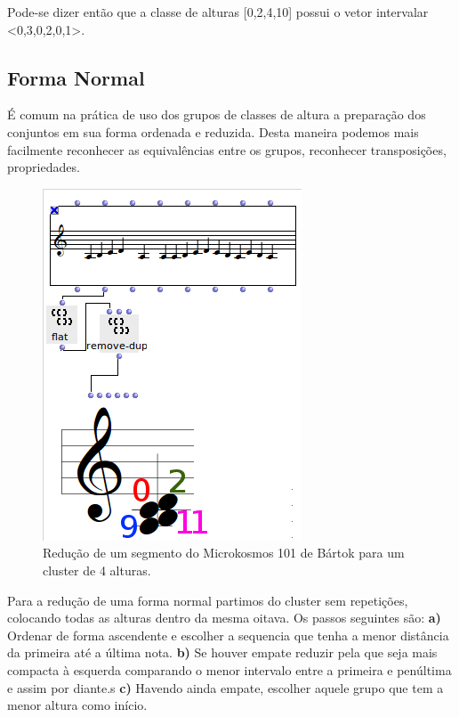 \documentclass[
	12pt,				%
	openright,			%
	twoside,			%
	a4paper,			%
	english,			%
	french,				%
	spanish,			%
	brazil				%
	]{abntex2}
\begin{document}
Pode-se dizer então que a classe de alturas [0,2,4,10] possui o vetor intervalar <0,3,0,2,0,1>.


\subsection{Forma Normal} 

É comum na prática de uso dos grupos de classes de altura a preparação dos conjuntos em sua forma ordenada e reduzida. Desta maneira podemos mais facilmente reconhecer as equivalências entre os grupos, reconhecer transposições, propriedades.


\begin{figure}[h]
	\caption{\label{fig_grafico}Redução de um segmento do Microkosmos 101 de Bártok para um cluster de 4 alturas. }
	\begin{center}
	    \includegraphics[scale=0.7]{OM_settheory/reducao_acorde.png}
	\end{center}
\end{figure}

Para a redução de uma forma normal partimos do cluster sem repetições, colocando todas as alturas dentro da mesma oitava. Os passos seguintes são: 
\textbf{a)} Ordenar de forma ascendente e escolher a sequencia que tenha a menor distância da primeira até a última nota.
\textbf{b)} Se houver empate reduzir pela que seja mais compacta à esquerda comparando o menor intervalo entre a primeira e penúltima e assim por diante.s
\textbf{c)} Havendo ainda empate, escolher aquele grupo que tem a menor altura como início. 
\end{document}
